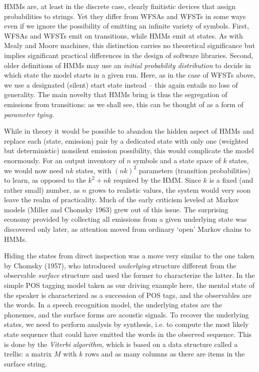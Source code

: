 HMMs are, at least in the discrete case, clearly finitistic devices that
assign probabilities to strings. Yet they differ from WFSAs and WFSTs in some
ways even if we ignore the possibility of emitting an infinite variety of
symbols. First, WFSAs and WFSTs emit on transitions, while HMMs emit at
states. As with Mealy and Moore machines, this distinction carries no
theoretical significance but implies significant practical differences in the
design of software libraries. Second, older definitions of HMMs may use an
{\it initial probability distribution} to decide in which state the model
starts in a given run. Here, as in the case of WFSTs above, we use a
designated (silent) start state instead -- this again entails no loss of
generality. The main novelty that HMMs bring is thus the segregation of
emissions from transitions: as we shall see, this can be thought of as a form
of {\it parameter tying.}

While in theory it would be possible to abandon the hidden aspect of HMMs and
replace each (state, emission) pair by a dedicated state with only one
(weighted but deterministic) nonsilent emission possibility, this would
complicate the model enormously. For an output inventory of $n$ symbols and a
state space of $k$ states, we would now need $nk$ states, with $(nk)^2$
parameters (transition probabilities) to learn, as opposed to the $k^2+nk$
required by the HMM. Since $k$ is a fixed (and rather small) number, as $n$
grows to realistic values, the system would very soon leave the realm of
practicality. Much of the early criticism leveled at Markov models (Miller and
Chomsky 1963) grew \nocite{Chomsky:1963} \nocite{Miller:1963} out of this
issue. The surprising economy provided by collecting all emissions from a
given underlying state was discovered only later, as attention moved from
ordinary `open' Markov chains to HMMs.

Hiding the states from direct inspection was a move very similar to the one
taken by Chomsky (1957), who introduced {\it underlying} structure different
from the observable {\it surface} structure and used the former to
characterize the latter. In the simple POS tagging model taken as our driving
example here, the mental state of the speaker is characterized as a succession
of POS tags, and the observables are the words. In a speech recognition model,
the underlying states are the phonemes, and the surface forms are acoustic
signals. To recover the underlying states, we need to perform analysis by
synthesis, i.e. to compute the most likely state sequence that could have
emitted the words in the observed sequence. This is done by the {\it Viterbi
  algorithm}, which is based on a data structure
called a trellis: a matrix $M$ with $k$ rows and as many columns as there are
items in the surface string.


